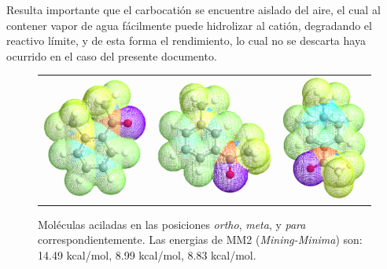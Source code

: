 \documentclass[fleqn,11pt]{SelfArx}
\begin{document}
Resulta importante que el carbocatión se encuentre aislado del aire, el cual al contener vapor de agua fácilmente puede hidrolizar al catión, degradando el reactivo límite, y de esta forma el rendimiento, lo cual no se descarta haya ocurrido en el caso del presente documento.
\newpage

\begin{figure}[ht]
	\centering
	\begin{tabular}{ccc}
		\includegraphics[width=0.3\linewidth]{structures/ortho.png} & 
		\includegraphics[width=0.3\linewidth]{structures/meta.png} &
		\includegraphics[width=0.25\linewidth]{structures/para.png}
	\end{tabular}
	
	\caption{Moléculas aciladas en las posiciones \textit{ortho}, \textit{meta}, y \textit{para} correspondientemente. Las energias de MM2 (\textit{Mining-Minima}) son: 14.49 kcal/mol, 8.99 kcal/mol, 8.83 kcal/mol.}
	\label{fig: energy}
\end{figure}
\end{document}
